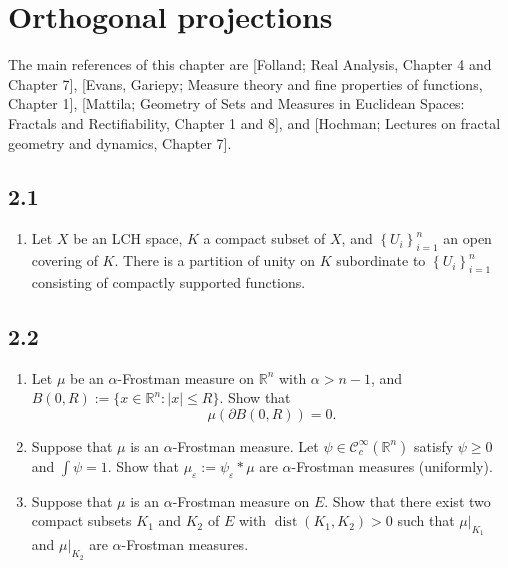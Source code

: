 \section{Orthogonal projections}

The main references of this chapter are [Folland; Real Analysis, Chapter 4 and Chapter 7], 
[Evans, Gariepy; Measure theory and fine properties of functions, Chapter 1], 
[Mattila; Geometry of Sets and Measures in Euclidean Spaces: Fractals and Rectifiability, Chapter 1 and 8], 
and [Hochman; Lectures on fractal geometry and dynamics, Chapter 7].

\subsection*{2.1}
\begin{enumerate}
    \item Let $X$ be an LCH space, $K$ a compact subset of $X$, 
    and $\left\{U_{i}\right\}_{i=1}^{n}$ an open covering of $K$. 
    There is a partition of unity on $K$ subordinate to $\left\{U_{i}\right\}_{i=1}^{n}$ consisting of compactly supported functions.
\end{enumerate}

\subsection*{2.2}
\begin{enumerate}
    \item Let $\mu$ be an $\alpha$-Frostman measure on $\mathbb{R}^{n}$ with $\alpha>n-1$, 
    and $B(0, R):=\{x \in\mathbb{R}^{n}:|x| \leq R\}$. Show that
    $$\mu(\partial B(0, R))=0.$$
    \item Suppose that $\mu$ is an $\alpha$-Frostman measure. 
    Let $\psi \in \mathcal{C}_{c}^{\infty}(\mathbb{R}^{n})$ satisfy $\psi \geq 0$ and $\int \psi=1$. 
    Show that $\mu_{\varepsilon}:=\psi_{\varepsilon} * \mu$ are $\alpha$-Frostman measures (uniformly).
    \item Suppose that $\mu$ is an $\alpha$-Frostman measure on $E$. 
    Show that there exist two compact subsets $K_{1}$ and $K_{2}$ of $E$ 
    with $\operatorname{dist}(K_{1}, K_{2})>0$ 
    such that $\left.\mu\right|_{K_{1}}$ and $\left.\mu\right|_{K_{2}}$ 
    are $\alpha$-Frostman measures.
\end{enumerate}


